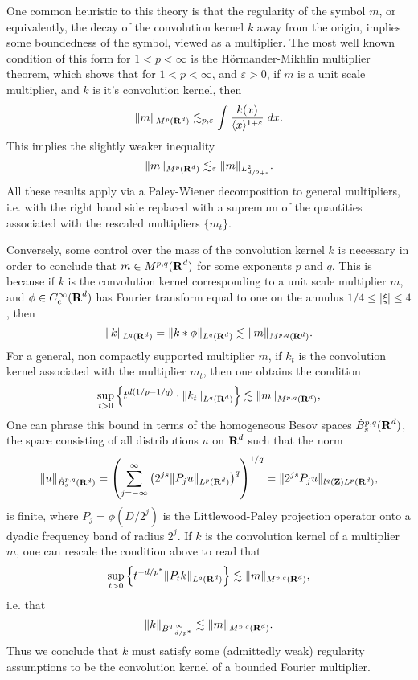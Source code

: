 One common heuristic to this theory is that the regularity of the symbol $m$, or equivalently, the decay of the convolution kernel $k$ away from the origin, implies some boundedness of the symbol, viewed as a multiplier. The most well known condition of this form for $1 < p < \infty$ is the H\"{o}rmander-Mikhlin multiplier theorem, which shows that for $1 < p < \infty$, and $\varepsilon > 0$, if $m$ is a unit scale multiplier, and $k$ is it's convolution kernel, then
%
\[ \| m \|_{M^p(\operatorname{\mathbf{R}}^d)} \lesssim_{p,\varepsilon} \int \frac{k(x)}{\langle x \rangle^{1 + \varepsilon}}\; dx. \]
%
This implies the slightly weaker inequality
%
\[ \| m \|_{M^p(\operatorname{\mathbf{R}}^d)} \lesssim_\varepsilon \| m \|_{L^2_{d/2 + \varepsilon}}. \]
%
All these results apply via a Paley-Wiener decomposition to general multipliers, i.e. with the right hand side replaced with a supremum of the quantities associated with the rescaled multipliers $\{ m_t \}$.

Conversely, some control over the mass of the convolution kernel $k$ is necessary in order to conclude that $m \in M^{p,q}(\operatorname{\mathbf{R}}^d)$ for some exponents $p$ and $q$. This is because if $k$ is the convolution kernel corresponding to a unit scale multiplier $m$, and $\phi \in C_c^\infty(\operatorname{\mathbf{R}}^d)$ has Fourier transform equal to one on the annulus $1/4 \leq |\xi| \leq 4$, then
%
\[ \| k \|_{L^q(\operatorname{\mathbf{R}}^d)} = \| k * \phi \|_{L^q(\operatorname{\mathbf{R}}^d)} \lesssim \| m \|_{M^{p,q}(\operatorname{\mathbf{R}}^d)}. \]
%
For a general, non compactly supported multiplier $m$, if $k_t$ is the convolution kernel associated with the multiplier $m_t$, then one obtains the condition
%
\[ \sup_{t > 0} \left\{ t^{d(1/p - 1/q)} \cdot \| k_t \|_{L^q(\operatorname{\mathbf{R}}^d)} \right\} \lesssim \| m \|_{M^{p,q}(\operatorname{\mathbf{R}}^d)}, \]
%
One can phrase this bound in terms of the homogeneous Besov spaces $\dot{B}^{p,q}_s(\operatorname{\mathbf{R}}^d)$, the space consisting of all distributions $u$ on $\operatorname{\mathbf{R}}^d$ such that the norm
%
\[ \| u \|_{\dot{B}^{p,q}_s(\operatorname{\mathbf{R}}^d)} = \left( \sum_{j = -\infty}^\infty \left( 2^{js} \| P_j u \|_{L^p(\operatorname{\mathbf{R}}^d)} \right)^q \right)^{1/q} = \| 2^{js} P_j u \|_{l^q(\operatorname{\mathbf{Z}}) L^p(\operatorname{\mathbf{R}}^d)}, \]
%
is finite, where $P_j = \phi(D/2^j)$ is the Littlewood-Paley projection operator onto a dyadic frequency band of radius $2^j$. If $k$ is the convolution kernel of a multiplier $m$, one can rescale the condition above to read that
%
\[ \sup_{t > 0} \left\{ t^{-d/p^*} \| P_t k \|_{L^q(\operatorname{\mathbf{R}}^d)} \right\} \lesssim \| m \|_{M^{p,q}(\operatorname{\mathbf{R}}^d)}, \]
%
i.e. that
%
\[ \| k \|_{\dot{B}^{q,\infty}_{-d/p^*}} \lesssim \| m \|_{M^{p,q}(\operatorname{\mathbf{R}}^d)}. \]
%
Thus we conclude that $k$ must satisfy some (admittedly weak) regularity assumptions to be the convolution kernel of a bounded Fourier multiplier.


